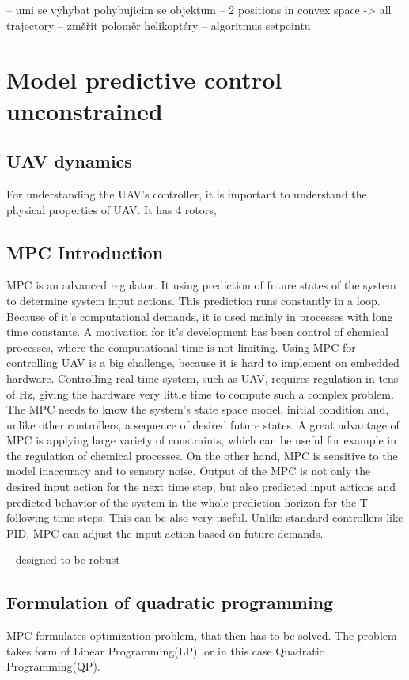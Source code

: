 \documentclass{article}
\begin{document}
-- umi se vyhybat pohybujicim se objektum
-- 2 positions in convex space -> all trajectory
-- změřit poloměr helikoptéry
-- algoritmus setpointu

\section{Model predictive control unconstrained}

\subsection{UAV dynamics}
For understanding the UAV's controller, it is important to understand the physical properties of UAV. It has 4 rotors, 


\subsection{MPC Introduction}
MPC is an advanced regulator. It using prediction of future states of the system to determine system input actions. This prediction runs constantly in a loop. Because of it's computational demands, it is used mainly in processes with long time constants. A motivation for it's development has been control of chemical processes, where the computational time is not limiting. Using MPC for controlling UAV is a big challenge, because it is hard to implement on embedded hardware. Controlling real time system, such as UAV, requires regulation in tens of Hz, giving the hardware very little time to compute such a complex problem.
The MPC needs to know the system's state space model, initial condition and, unlike other controllers, a sequence of desired future states. A great advantage of MPC is applying large variety of constraints, which can be useful for example in the regulation of chemical processes. On the other hand, MPC is sensitive to the model inaccuracy and to sensory noise. Output of the MPC is not only the desired input action for the next time step, but also predicted input actions and predicted behavior of the system in the whole prediction horizon for the T following time steps. This can be also very useful. Unlike standard controllers like PID, MPC can adjust the input action based on future demands.

-- designed to be robust

\subsection{Formulation of quadratic programming}
MPC formulates optimization problem, that then has to be solved. The problem takes form of Linear Programming(LP), or in this case Quadratic Programming(QP). 
\end{document}
